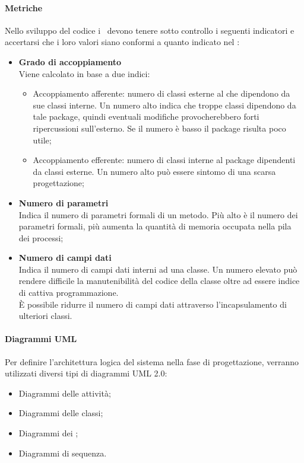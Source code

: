 \documentclass[../NormeDiProgetto.tex]{subfiles}
\begin{document}
			\paragraph{Metriche\\}
				Nello sviluppo del codice i \progettisti\ devono tenere sotto controllo i seguenti indicatori e accertarsi che i loro valori siano conformi a quanto indicato nel \pianodiqualificav:
				\begin{itemize}
					\item \textbf{Grado di accoppiamento\\}
					Viene calcolato in base a due indici:
						\begin{itemize}
							\item Accoppiamento afferente: numero di classi esterne
							al  che dipendono da sue classi interne. Un numero
							alto indica che troppe classi dipendono da tale package, quindi
							eventuali modifiche provocherebbero forti ripercussioni
							sull'esterno. Se il numero è basso il package risulta poco
							utile;
							\item Accoppiamento efferente: numero di classi interne
							al package dipendenti da classi esterne. Un numero alto può
							essere sintomo di una scarsa progettazione;
						\end{itemize}
					\item \textbf{Numero di parametri\\}
						Indica il numero di parametri formali di un metodo. Più alto è il
						numero dei parametri formali, più aumenta la quantità di memoria
						occupata nella pila dei processi;
					\item \textbf{Numero di campi dati\\}
						Indica il numero di campi dati interni ad una classe. Un numero
						elevato può rendere difficile la manutenibilità del codice della
						classe oltre ad essere indice di cattiva programmazione.\\
						È possibile ridurre il numero di campi dati attraverso
						l'incapsulamento di ulteriori classi.	
				\end{itemize}
			\paragraph{Diagrammi UML\\}
				Per definire l'architettura logica del sistema nella fase di progettazione,
				verranno utilizzati	diversi tipi di diagrammi UML 2.0:
				\begin{itemize}
					\item Diagrammi delle attività;
					\item Diagrammi delle classi;
					\item Diagrammi dei ;
					\item Diagrammi di sequenza.
				\end{itemize}
\end{document}
